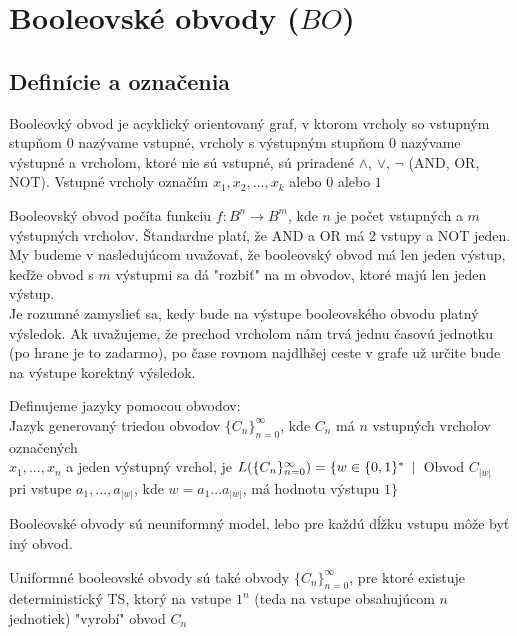 \chapter{Booleovské obvody ($BO$)}

\section{Definície a označenia}

\begin{definicia}
Booleovký obvod je acyklický orientovaný graf, v ktorom vrcholy so vstupným stupňom 0
nazývame vstupné, vrcholy s výstupným stupňom 0 nazývame výstupné a vrcholom, ktoré nie
sú vstupné, sú priradené $\wedge$, $\vee$, $\neg$ (AND, OR, NOT). Vstupné vrcholy označím
$x_1, x_2, ..., x_k$ alebo $0$ alebo $1$
\end{definicia}

Booleovský obvod počíta funkciu $f: B^n \rightarrow B^m$, kde $n$ je počet vstupných a
$m$ výstupných vrcholov. Štandardne platí, že AND a OR má 2 vstupy a NOT jeden. My budeme
v nasledujúcom uvažovať, že booleovský obvod má len jeden výstup, keďže obvod s $m$
výstupmi sa dá "rozbiť" na m obvodov, ktoré majú len jeden výstup.\\ Je rozumné zamyslieť
sa, kedy bude na výstupe booleovského obvodu platný výsledok. Ak uvažujeme, že prechod
vrcholom nám trvá jednu časovú jednotku (po hrane je to zadarmo), po čase rovnom
najdlhšej ceste v grafe už určite bude na výstupe korektný výsledok.

\begin{definicia}
Definujeme jazyky pomocou obvodov:\\ Jazyk generovaný triedou obvodov
$\{C_n\}_{n=0}^{\infty}$, kde $C_n$ má $n$ vstupných vrcholov označených\\ $x_1,...,x_n$
a jeden výstupný vrchol, je $L(\{C_n\}_{n=0}^{\infty})=\{w \in \{0,1\}^* \enspace |\enspace $Obvod
$C_{|w|}$ pri vstupe $a_1,...,a_{|w|}$, kde $w=a_1...a_{|w|}$, má hodnotu výstupu $1\}$
\end{definicia}

Booleovské obvody sú neuniformný model, lebo pre každú dĺžku vstupu môže byť iný obvod.

\begin{definicia}
Uniformné booleovské obvody sú také obvody $\{C_n\}_{n=0}^{\infty}$, pre ktoré existuje
deterministický TS, ktorý na vstupe $1^n$ (teda na vstupe obsahujúcom $n$ jednotiek)
"vyrobí" obvod $C_n$
\end{definicia}

